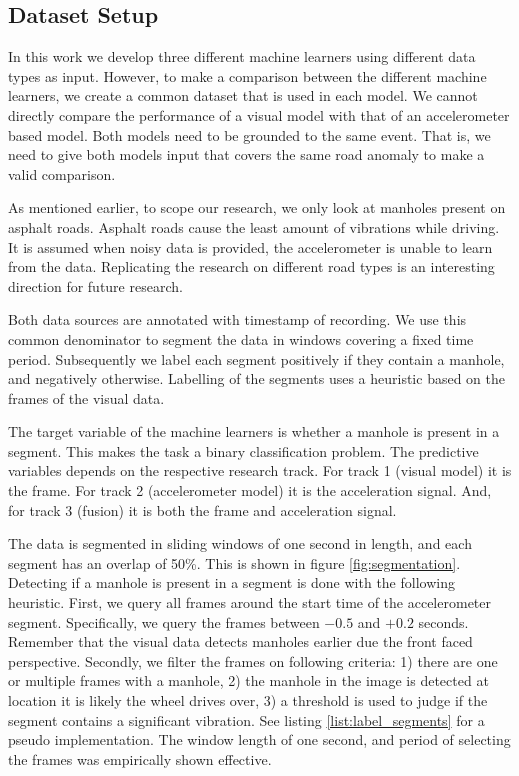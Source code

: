 \subsection{Dataset Setup}
\label{sec:dataset-setup}

In this work we develop three different machine learners using different data types as input. However, to make a comparison between the different machine learners, we create a common dataset that is used in each model. We cannot directly compare the performance of a visual model with that of an accelerometer based model. Both models need to be grounded to the same event. That is, we need to give both models input that covers the same road anomaly to make a valid comparison.

As mentioned earlier, to scope our research, we only look at manholes present on asphalt roads. Asphalt roads cause the least amount of vibrations while driving. It is assumed when noisy data is provided, the accelerometer is unable to learn from the data. Replicating the research on different road types is an interesting direction for future research.

Both data sources are annotated with timestamp of recording. We use this common denominator to segment the data in windows covering a fixed time period. Subsequently we label each segment positively if they contain a manhole, and negatively otherwise. Labelling of the segments uses a heuristic based on the frames of the visual data. 

The target variable of the machine learners is whether a manhole is present in a segment. This makes the task a binary classification problem. The predictive variables depends on the respective research track. For track 1 (visual model) it is the frame. For track 2 (accelerometer model) it is the acceleration signal. And, for track 3 (fusion) it is both the frame and acceleration signal. 

The data is segmented in sliding windows of one second in length, and each segment has an overlap of 50\%. This is shown in figure \ref{fig:segmentation}. Detecting if a manhole is present in a segment is done with the following heuristic. First, we query all frames around the start time of the accelerometer segment. Specifically, we query the frames between $-0.5$ and $+0.2$ seconds. Remember that the visual data detects manholes earlier due the front faced perspective. Secondly, we filter the frames on following criteria: 1) there are one or multiple frames with a manhole, 2) the manhole in the image is detected at location it is likely the wheel drives over, 3) a threshold is used to judge if the segment contains a significant vibration. See listing \ref{list:label_segments} for a pseudo implementation. The window length of one second, and period of selecting the frames was empirically shown effective.

